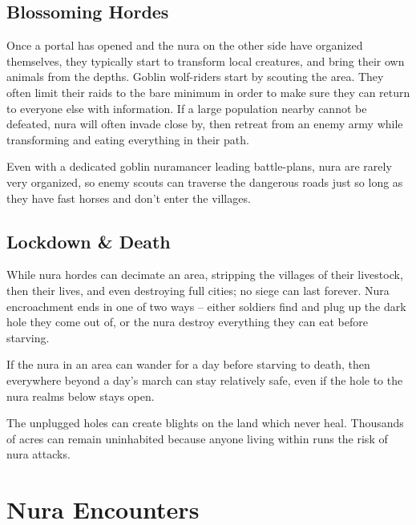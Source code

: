 \begin{multicols}{2}
\subsection{Blossoming Hordes}

Once a portal has opened and the nura on the other side have organized themselves, they typically start to transform local creatures, and bring their own animals from the depths.
Goblin wolf-riders start by scouting the area.
They often limit their raids to the bare minimum in order to make sure they can return to everyone else with information.
If a large population nearby cannot be defeated, nura will often invade close by, then retreat from an enemy army while transforming and eating everything in their path.

Even with a dedicated goblin nuramancer leading battle-plans, nura are rarely very organized, so enemy scouts can traverse the dangerous roads just so long as they have fast horses and don't enter the villages.

\subsection{Lockdown \& Death}

While nura hordes can decimate an area, stripping the villages of their livestock, then their lives, and even destroying full cities; no siege can last forever. 
Nura encroachment ends in one of two ways -- either soldiers find and plug up the dark hole they come out of, or the nura destroy everything they can eat before starving.

If the nura in an area can wander for a day before starving to death, then everywhere beyond a day's march can stay relatively safe, even if the hole to the nura realms below stays open.

The unplugged holes can create blights on the land which never heal.
Thousands of acres can remain uninhabited because anyone living within runs the risk of nura attacks.

\end{multicols}

\section{Nura Encounters}

